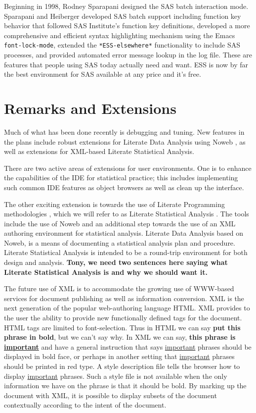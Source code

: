 \documentclass{article}
\newcommand{\stexttt}[1]{{\small\texttt{#1}}}
\newcommand{\marpar}[1]{\marginpar{\raggedright#1}}
\begin{document}
Beginning in 1998, Rodney Sparapani designed the SAS batch interaction
mode.  Sparapani and Heiberger developed SAS batch support including
function key behavior that followed SAS Institute's function key
definitions,  developed a more comprehensive and efficient syntax
highlighting mechanism using the Emacs \stexttt{font-lock-mode},
extended the  \stexttt{*ESS-elsewhere*} functionality to include SAS processes,
and provided  automated error message lookup in the log file.
These are features that people using SAS today
actually need and want.  ESS is now by far the best environment for
SAS available at any price and it's free.

\section{Remarks and Extensions}
\label{sec:remarks}

Much of what has been done recently is debugging and tuning.  New
features in the plans include robust extensions for Literate Data
Analysis using Noweb \citep{NRamsey:1994}, as well as extensions for
XML-based Literate Statistical Analysis.

There are two active areas of extensions for user environments.  One
is to enhance the capabilities of the IDE for statistical practice;
this includes implementing such common IDE features as object browsers
as well as clean up the interface.

The other exciting extension is towards the use of Literate
Programming methodologies \citep{Knuth:1992,NRamsey:1994}, which we
will refer to as Literate Statistical Analysis \citep{ross:lunt:2001}.
The tools include the use of Noweb \citep{NRamsey:1994} and an
additional step towards the use of an XML authoring environment for
statistical analysis.  Literate Data Analysis based on Noweb, is a
means of documenting a statistical analysis plan and procedure.
Literate Statistical Analysis is intended to be a round-trip
environment for both design and analysis.
{\bf Tony, we need two sentences here saying what Literate Statistical Analysis
is and why we should want it.}\marpar{Tony}


The future use of XML is to accommodate the growing use of WWW-based
services for document publishing as well as information conversion.
XML is the next generation of the popular web-authoring language HTML.
XML provides to the user the ability to provide new functionally defined tags
for the document.  HTML tags are limited to font-selection.  Thus in HTML
we can say {\bf put this phrase in bold}, but we can't say why.  In XML
\marpar{Tony, check this for validity.}
we can say, {\bf this phrase is \underline{important}} and have a general
instruction that says \underline{important} phrases should be displayed in bold
face, or perhaps in another setting that \underline{important} phrases should
be printed in red type.  A style description file tells the browser how to
display \underline{important} phrases.  Such a style file is not available
when the only information we have on the phrase is that it should be bold.
By marking up the document with XML, it is possible to display subsets
of the document contextually according to the intent of the document.
\end{document}

